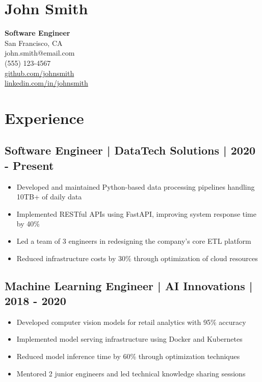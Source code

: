 \documentclass[11pt,a4paper]{article}
\begin{document}
\section*{John Smith}
\textbf{Software Engineer} \\
San Francisco, CA \\
john.smith@email.com \\
(555) 123-4567 \\
\href{https://github.com/johnsmith}{github.com/johnsmith} \\
\href{https://linkedin.com/in/johnsmith}{linkedin.com/in/johnsmith}

\section*{Experience}
\subsection*{Software Engineer | DataTech Solutions | 2020 - Present}
\begin{itemize}
    \item Developed and maintained Python-based data processing pipelines handling 10TB+ of daily data
    \item Implemented RESTful APIs using FastAPI, improving system response time by 40\%
    \item Led a team of 3 engineers in redesigning the company's core ETL platform
    \item Reduced infrastructure costs by 30\% through optimization of cloud resources
\end{itemize}

\subsection*{Machine Learning Engineer | AI Innovations | 2018 - 2020}
\begin{itemize}
    \item Developed computer vision models for retail analytics with 95\% accuracy
    \item Implemented model serving infrastructure using Docker and Kubernetes
    \item Reduced model inference time by 60\% through optimization techniques
    \item Mentored 2 junior engineers and led technical knowledge sharing sessions
\end{itemize}
\end{document}
